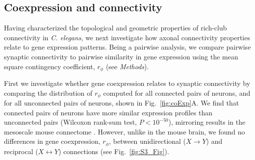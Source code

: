 \documentclass[10pt,letterpaper]{article}
\begin{document}
\subsection*{Coexpression and connectivity}

Having characterized the topological and geometric properties of rich-club connectivity in \emph{C. elegans}, we next investigate how axonal connectivity properties relate to gene expression patterns.
Being a pairwise analysis, we compare pairwise synaptic connectivity to pairwise similarity in gene expression using the mean square contingency coefficient, $r_\phi$ (see \emph{Methods}).

First we investigate whether gene coexpression relates to synaptic connectivity by comparing the distribution of $r_\phi$ computed for all connected pairs of neurons, and for all unconnected pairs of neurons, shown in Fig.~\ref{fig:coExp}A.
We find that connected pairs of neurons have more similar expression profiles than unconnected pairs (Wilcoxon rank-sum test, $P < 10^{-50}$), mirroring results in the mesoscale mouse connectome \cite{Fulcher:2016ck}.
However, unlike in the mouse brain, we found no differences in gene coexpression, $r_\phi$, between unidirectional ($X \rightarrow Y$) and reciprocal ($X \leftrightarrow Y$) connections (see Fig.~\ref{fig:S3_Fig}).
\end{document}
